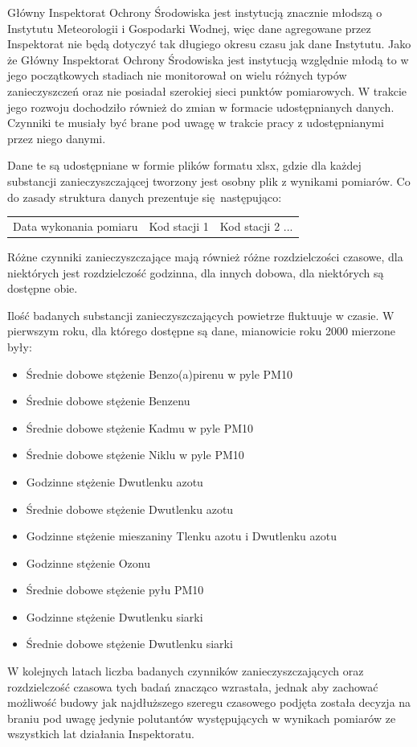 \documentclass[10pt,a4paper]{article}
\begin{document}
Główny Inspektorat Ochrony Środowiska jest instytucją znacznie młodszą o Instytutu Meteorologii i Gospodarki Wodnej, więc dane agregowane przez Inspektorat nie będą dotyczyć tak długiego okresu czasu jak dane Instytutu. Jako że Główny Inspektorat Ochrony Środowiska jest instytucją względnie młodą to w jego początkowych stadiach nie monitorował on wielu różnych typów zanieczyszczeń oraz nie posiadał szerokiej sieci punktów pomiarowych. W trakcie jego rozwoju dochodziło również do zmian w formacie udostępnianych danych. Czynniki te musiały być brane pod uwagę w trakcie pracy z udostępnianymi przez niego danymi. 

Dane te są udostępniane w formie plików formatu xlsx, gdzie dla każdej substancji zanieczyszczającej tworzony jest osobny plik z wynikami pomiarów. Co do zasady struktura danych prezentuje się następująco:
\begin{center}
	\begin{tabular}{|c|c|c}
		Data wykonania pomiaru & Kod stacji 1 & Kod stacji 2 ...
	\end{tabular}
\end{center}
Różne czynniki zanieczyszczające mają również różne rozdzielczości czasowe, dla niektórych jest rozdzielczość godzinna, dla innych dobowa, dla niektórych są dostępne obie. 

Ilość badanych substancji zanieczyszczających powietrze fluktuuje w czasie. W pierwszym roku, dla którego dostępne są dane, mianowicie roku 2000 mierzone były:
\begin{itemize}
	\item Średnie dobowe stężenie Benzo(a)pirenu w pyle PM10
	\item Średnie dobowe stężenie Benzenu
	\item Średnie dobowe stężenie Kadmu w pyle PM10 
	\item Średnie dobowe stężenie Niklu w pyle PM10
	\item Godzinne stężenie Dwutlenku azotu
	\item Średnie dobowe stężenie Dwutlenku azotu
	\item Godzinne stężenie mieszaniny Tlenku azotu i Dwutlenku azotu
	\item Godzinne stężenie Ozonu
	\item Średnie dobowe stężenie pyłu PM10
	\item Godzinne stężenie Dwutlenku siarki
	\item Średnie dobowe stężenie Dwutlenku siarki
\end{itemize}
W kolejnych latach liczba badanych czynników zanieczyszczających oraz rozdzielczość czasowa tych badań znacząco wzrastała, jednak aby zachować możliwość budowy jak najdłuższego szeregu czasowego podjęta została decyzja na braniu pod uwagę jedynie polutantów występujących w wynikach pomiarów ze wszystkich lat działania Inspektoratu. 
\end{document}
